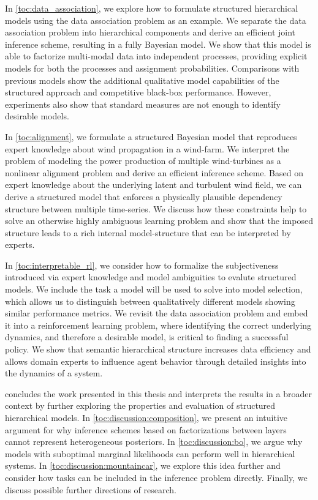 In \cref{toc:data_association}, we explore how to formulate structured hierarchical models using the data association problem as an example.
We separate the data association problem into hierarchical components and derive an efficient joint inference scheme, resulting in a fully Bayesian model.
We show that this model is able to factorize multi-modal data into independent processes, providing explicit models for both the processes and assignment probabilities.
Comparisons with previous models show the additional qualitative model capabilities of the structured approach and competitive black-box performance.
However, experiments also show that standard measures are not enough to identify desirable models.

In \cref{toc:alignment}, we formulate a structured Bayesian model that reproduces expert knowledge about wind propagation in a wind-farm.
We interpret the problem of modeling the power production of multiple wind-turbines as a nonlinear alignment problem and derive an efficient inference scheme.
Based on expert knowledge about the underlying latent and turbulent wind field, we can derive a structured model that enforces a physically plausible dependency structure between multiple time-series.
We discuss how these constraints help to solve an otherwise highly ambiguous learning problem and show that the imposed structure leads to a rich internal model-structure that can be interpreted by experts.

In \cref{toc:interpretable_rl}, we consider how to formalize the subjectiveness introduced via expert knowledge and model ambiguities to evalute structured models.
We include the task a model will be used to solve into model selection, which allows us to distinguish between qualitatively different models showing similar performance metrics.
We revisit the data association problem and embed it into a reinforcement learning problem, where identifying the correct underlying dynamics, and therefore a desirable model, is critical to finding a successful policy.
We show that semantic hierarchical structure increases data efficiency and allows domain experts to influence agent behavior through detailed insights into the dynamics of a system.

 concludes the work presented in this thesis and interprets the results in a broader context by further exploring the properties and evaluation of structured hierarchical models.
In \cref{toc:discussion:composition}, we present an intuitive argument for why inference schemes based on factorizations between layers cannot represent heterogeneous posteriors.
In \cref{toc:discussion:bo}, we argue why models with suboptimal marginal likelihoods can perform well in hierarchical systems.
In \cref{toc:discussion:mountaincar}, we explore this idea further and consider how tasks can be included in the inference problem directly.
Finally, we discuss possible further directions of research.
